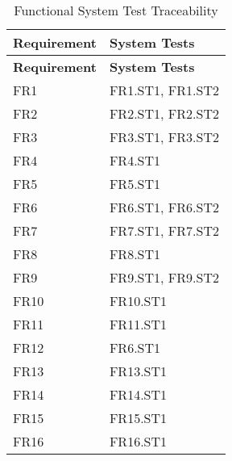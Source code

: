 \documentclass[12pt, titlepage]{article}
\begin{document}
\begin{longtable}[H]{|p{} | p{}|}
  \caption{Functional System Test Traceability}
  \label{TblFRSTTraceability}\\
  \hline
  \textbf{Requirement} & \textbf{System Tests}\\
  \hline
  \endfirsthead
  \hline
  \textbf{Requirement} & \textbf{System Tests}\\
  \hline
  \endhead
  FR1 & FR1.ST1, FR1.ST2\\
  \hline
  FR2 & FR2.ST1, FR2.ST2\\
  \hline
  FR3 & FR3.ST1, FR3.ST2\\
  \hline
  FR4 & FR4.ST1\\
  \hline
  FR5 & FR5.ST1\\
  \hline
  FR6 & FR6.ST1, FR6.ST2\\
  \hline
  FR7 & FR7.ST1, FR7.ST2\\
  \hline
  FR8 & FR8.ST1\\
  \hline
  FR9 & FR9.ST1, FR9.ST2\\
  \hline
  FR10 & FR10.ST1\\
  \hline
  FR11 & FR11.ST1\\
  \hline
  FR12 & FR6.ST1\\
  \hline
  FR13 & FR13.ST1\\
  \hline
  FR14 & FR14.ST1\\
  \hline
  FR15 & FR15.ST1\\
  \hline
  FR16 & FR16.ST1\\
  \hline
\end{longtable}
\end{document}
